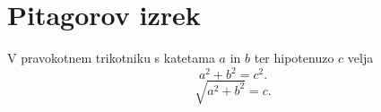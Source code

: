 \documentclass{article}
\begin{document}
\section*{Pitagorov izrek}
V pravokotnem trikotniku s katetama \(a\) in \(b\) ter hipotenuzo \(c\) velja
\[ a^2 + b^2 = c^2 .\]
\[\sqrt{a^2 + b^2} = c .\]
\end{document}
